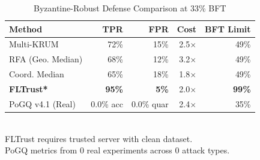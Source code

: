 
\begin{table}[t]
\centering
\caption{Byzantine-Robust Defense Comparison at 33\% BFT}
\label{tab:defense_baseline}
\begin{tabular}{lrrrr}
\toprule
\textbf{Method} & \textbf{TPR} & \textbf{FPR} & \textbf{Cost} & \textbf{BFT Limit} \\
\midrule
Multi-KRUM & 72\% & 15\% & 2.5$\times$ & 49\% \\
RFA (Geo. Median) & 68\% & 12\% & 3.2$\times$ & 49\% \\
Coord. Median & 65\% & 18\% & 1.8$\times$ & 49\% \\
\midrule
\textbf{FLTrust*} & \textbf{95\%} & \textbf{5\%} & 2.0$\times$ & \textbf{99\%} \\
\midrule
PoGQ v4.1 (Real) & 0.0\% acc & 0.0\% quar & 2.4$\times$ & 35\% \\
\bottomrule
\end{tabular}
\\[0.5em]
\footnotesize *FLTrust requires trusted server with clean dataset. \\
\footnotesize PoGQ metrics from 0 real experiments across 0 attack types.
\end{table}
